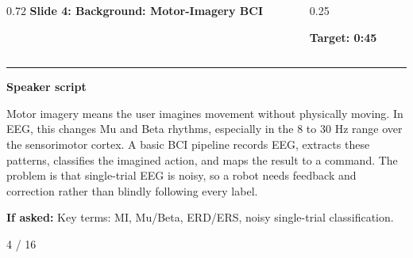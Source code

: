 \documentclass[aspectratio=169,10pt]{beamer}
\begin{document}
\begin{frame}[plain]
\vspace*{0.16cm}
\begin{columns}[T,totalwidth=\textwidth]
\begin{column}{0.72\textwidth}
{\fontsize{17}{18.5}\selectfont\bfseries Slide 4: Background: Motor-Imagery BCI}
\end{column}
\begin{column}{0.25\textwidth}
\raggedleft
\colorbox{noteCream}{\parbox{0.88\linewidth}{\centering\bfseries Target: 0:45}}
\end{column}
\end{columns}
\vspace{0.10cm}
{\color{uomPurple}\rule{\textwidth}{1.2pt}}
\vspace{0.18cm}
{\color{uomPurple}\bfseries Speaker script}
\vspace{0.06cm}
\setlength{\fboxsep}{6pt}
\noindent\colorbox{panelGrey}{\begin{minipage}{0.94\textwidth}
\justifying\fontsize{11.0}{13.4}\selectfont
Motor imagery means the user imagines movement without physically moving. In EEG, this changes Mu and Beta rhythms, especially in the 8 to 30 Hz range over the sensorimotor cortex. A basic BCI pipeline records EEG, extracts these patterns, classifies the imagined action, and maps the result to a command. The problem is that single-trial EEG is noisy, so a robot needs feedback and correction rather than blindly following every label.
\end{minipage}}
\vspace{0.22cm}
\noindent\colorbox{noteCream}{\begin{minipage}{0.94\textwidth}
\fontsize{9.6}{11.6}\selectfont
{\bfseries If asked:} Key terms: MI, Mu/Beta, ERD/ERS, noisy single-trial classification.
\end{minipage}}
\vfill
\hfill{\color{textDark}\scriptsize 4 / 16}
\end{frame}
\end{document}
